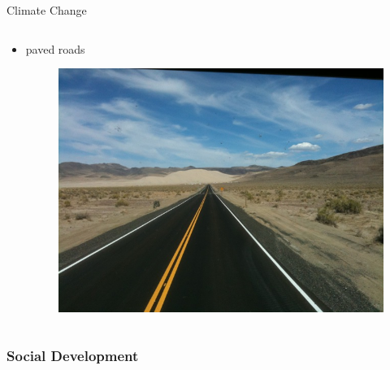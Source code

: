 \documentclass{beamer}
\begin{document}
\begin{frame}{Climate Change}
\begin{columns}
  \begin{column}{0.5\textwidth}
     \begin{itemize}
	\item paved roads
		\begin{figure}
		\centering
		\includegraphics[scale=0.2]{images/paved_road.jpg}
		\end{figure}
     \end{itemize}
  \end{column}
\end{columns}
\end{frame}


\subsubsection{Social Development}
\end{document}
